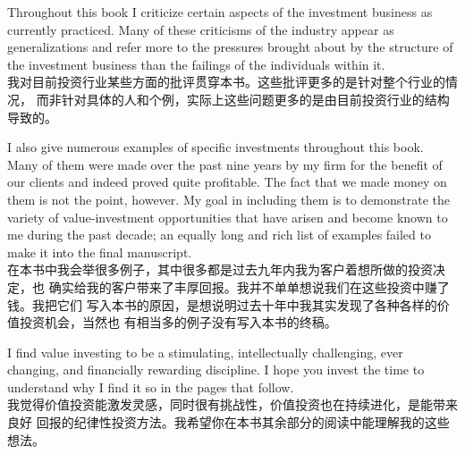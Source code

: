 \begin{verseparallel}
  {
    Throughout this book I criticize certain aspects of the investment business
    as currently practiced. Many of these criticisms of the industry appear as
    generalizations and refer more to the pressures brought about by the
    structure of the investment business than the failings of the individuals
    within it. \\
  }
  {
    我对目前投资行业某些方面的批评贯穿本书。这些批评更多的是针对整个行业的情况，
    而非针对具体的人和个例，实际上这些问题更多的是由目前投资行业的结构导致的。
  }
\end{verseparallel}
\begin{verseparallel}
  {
    I also give numerous examples of specific investments throughout this book.
    Many of them were made over the past nine years by my firm for the benefit
    of our clients and indeed proved quite profitable. The fact that we made
    money on them is not the point, however. My goal in including them is to
    demonstrate the variety of value-investment opportunities that have arisen
    and become known to me during the past decade; an equally long and rich list
    of examples failed to make it into the final manuscript. \\
  }
  {
    在本书中我会举很多例子，其中很多都是过去九年内我为客户着想所做的投资决定，也
    确实给我的客户带来了丰厚回报。我并不单单想说我们在这些投资中赚了钱。我把它们
    写入本书的原因，是想说明过去十年中我其实发现了各种各样的价值投资机会，当然也
    有相当多的例子没有写入本书的终稿。
  }
\end{verseparallel}
\begin{verseparallel}
  {
    I find value investing to be a stimulating, intellectually challenging, ever
    changing, and financially rewarding discipline. I hope you invest the time
    to understand why I find it so in the pages that follow. \\
  }
  {
    我觉得价值投资能激发灵感，同时很有挑战性，价值投资也在持续进化，是能带来良好
    回报的纪律性投资方法。我希望你在本书其余部分的阅读中能理解我的这些想法。
  }
\end{verseparallel}


